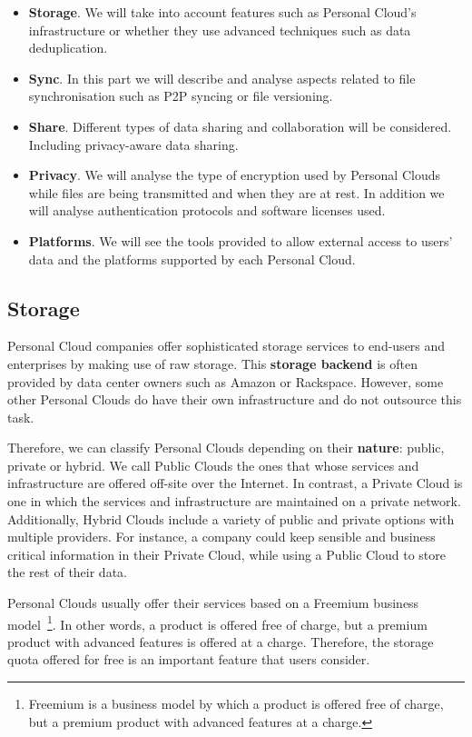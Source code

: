 {\begin{itemize}
\item \textbf{Storage}. We will take into account features such as Personal Cloud's infrastructure or whether they use advanced techniques such as data deduplication.
\item \textbf{Sync}. In this part we will describe and analyse aspects related to file synchronisation such as P2P syncing or file versioning. 
\item \textbf{Share}. Different types of data sharing and collaboration will be considered. Including privacy-aware data sharing.
\item \textbf{Privacy}. We will analyse the type of encryption used by Personal Clouds while files are being transmitted and when they are at rest. In addition we will analyse authentication protocols and software licenses used.
\item \textbf{Platforms}. We will see the tools provided to allow external access to users' data and the platforms supported by each Personal Cloud.
\end{itemize}


\subsection{Storage}

Personal Cloud companies offer sophisticated storage services to end-users and enterprises by making use of raw storage. This \textbf{storage backend} is often provided by data center owners such as Amazon or Rackspace. However, some other Personal Clouds do have their own infrastructure and do not outsource this task.

Therefore, we can classify Personal Clouds depending on their \textbf{nature}: public, private or hybrid. We call Public Clouds the ones that whose services and infrastructure are offered off-site over the Internet. In contrast, a Private Cloud is one in which the services and infrastructure are maintained on a private network. Additionally, Hybrid Clouds include a variety of public and private options with multiple providers. For instance, a company could keep sensible and business critical information in their Private Cloud, while using a Public Cloud to store the rest of their data.

Personal Clouds usually offer their services based on a Freemium business model~\footnote{Freemium is a business model by which a product is offered free of charge, but a premium product with advanced features at a charge.}. In other words, a product is offered free of charge, but a premium product with advanced features is offered at a charge. Therefore, the storage quota offered for free is an important feature that users consider.

}
